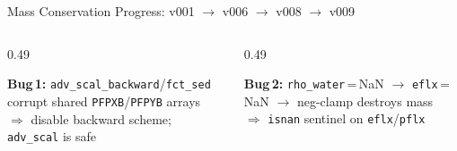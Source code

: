 \documentclass[aspectratio=169,10pt]{beamer}
\begin{document}
\begin{frame}{Mass Conservation Progress: v001 $\to$ v006 $\to$ v008 $\to$ v009}
\begin{columns}[T]
  \end{columns}

  \vspace{0.1em}
  \begin{columns}[T]
    \begin{column}{0.49\textwidth}
      \centering
      \colorbox{red!15}{\parbox{0.95\textwidth}{\centering\footnotesize
        \textbf{Bug\,1:} \texttt{adv\_scal\_backward}/\texttt{fct\_sed}
        corrupt shared \texttt{PFPXB}/\texttt{PFPYB} arrays\\
        $\Rightarrow$ disable backward scheme; \texttt{adv\_scal} is safe
      }}
    \end{column}
    \begin{column}{0.49\textwidth}
      \centering
      \colorbox{red!15}{\parbox{0.95\textwidth}{\centering\footnotesize
        \textbf{Bug\,2:} \texttt{rho\_water}\,=\,NaN $\to$ \texttt{eflx}\,=\,NaN
        $\to$ neg-clamp destroys mass\\
        $\Rightarrow$ \texttt{isnan} sentinel on \texttt{eflx}/\texttt{pflx}
      }}
    \end{column}
  \end{columns}

\end{frame}
\end{document}
